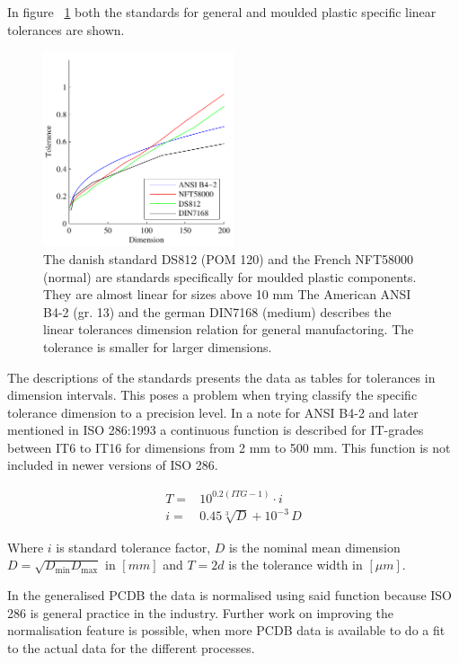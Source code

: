 \documentclass[aip,amsmath, reprint, author-year]{revtex4-1}
\begin{document}
In figure ~\ref{fig:tolstd} both the standards for general and moulded plastic specific linear tolerances are shown.

\begin{figure}
\includegraphics[width=0.5\textwidth]{Tolerance_standards.pdf}
\caption{\label{fig:tolstd} The danish standard DS812 (POM 120) and the French NFT58000 (normal) are standards specifically for moulded plastic components. They are almost linear for sizes above 10 mm The American ANSI B4-2 (gr. 13) and the german DIN7168 (medium) describes the linear tolerances dimension relation for general manufactoring. The tolerance is smaller for larger dimensions. }
\end{figure}

The descriptions of the standards presents the data as tables for tolerances in dimension intervals. This poses a problem when trying classify the specific tolerance dimension to a precision level.
In a note for ANSI B4-2  and later mentioned in ISO 286:1993 a continuous function is described for IT-grades between IT6 to IT16 for dimensions from 2 mm to 500 mm. This function is not included in newer versions of ISO 286.

\begin{align}
	T =& 10^{0.2 (ITG -1)} \cdot i \\
	i =& 0.45 \sqrt[3]{D} + 10^{-3} \, D 
\end{align}

Where $i$ is standard tolerance factor, $D$ is the nominal mean dimension $D = \sqrt{D_{\textrm{min}} D_\textrm{max}}$ in $[mm]$ and $T = 2 d$ is the tolerance width in $[\mu m]$. 

In the generalised PCDB the data is normalised using said function because ISO 286 is general practice in the industry. 
Further work on improving the normalisation feature is possible, when more PCDB data is available to do a fit to the actual data for the different processes.
\end{document}
